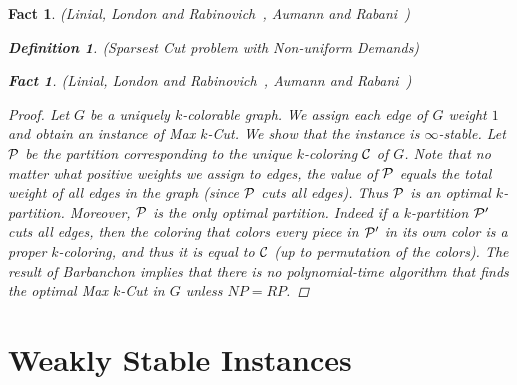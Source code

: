 \documentclass[twoside,leqno,twocolumn]{article}
\newtheorem{Definition}[theorem]{Definition}
\newtheorem{fact}[theorem]{Fact}
\begin{document}
\begin{fact}{\sc (Linial, London and Rabinovich~\cite{LLR}, Aumann and Rabani~\cite{AR})}
\begin{Definition} {\sc (Sparsest Cut problem with Non-uniform Demands)}
\begin{fact}{\sc (Linial, London and Rabinovich~\cite{LLR}, Aumann and Rabani~\cite{AR})}
\begin{proof}
Let $G$ be a uniquely $k$-colorable graph. We assign each edge of $G$ weight $1$ and obtain an instance of Max $k$-Cut.
We show that the instance is $\infty$-stable. Let $\cal P$ be the partition corresponding to 
the unique $k$-coloring $\cal C$ of $G$. Note that no matter what positive weights we assign to edges,
the value of $\cal P$ equals the total weight of all edges in the graph (since $\cal P$ cuts all edges).
Thus $\cal P$ is an optimal $k$-partition. Moreover, $\cal P$ is the only optimal partition. Indeed
if a $k$-partition ${\cal P}'$ cuts all edges, then the coloring that colors every piece in ${\cal P}'$
in its own color is a proper $k$-coloring, and thus it is equal to $\cal C$ (up to permutation of the colors).
The result of Barbanchon implies that there is no polynomial-time algorithm that finds the optimal 
Max $k$-Cut in $G$ unless $NP=RP$.
\end{proof}



\section{Weakly Stable Instances}\label{sec:weakstability}

\end{fact}
\end{Definition}
\end{fact}
\end{document}
